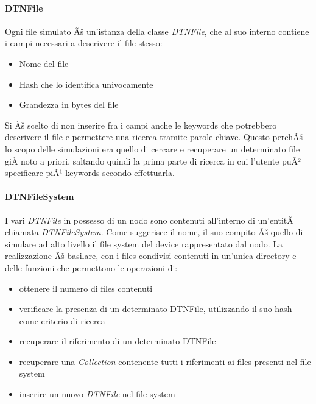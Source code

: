 \paragraph{DTNFile}
Ogni file simulato Ãš un'istanza della classe \textit{DTNFile}, che al suo interno contiene i campi necessari a descrivere il file stesso:

\begin{itemize}
\item Nome del file
\item Hash che lo identifica univocamente
\item Grandezza in bytes del file
\end{itemize}

Si Ãš scelto di non inserire fra i campi anche le keywords che potrebbero descrivere il file e permettere una ricerca tramite parole chiave. Questo perchÃš lo scopo delle simulazioni era quello di cercare e recuperare un determinato file giÃ  noto a priori, saltando quindi la prima parte di ricerca in cui l'utente puÃ² specificare piÃ¹ keywords secondo effettuarla.

\paragraph{DTNFileSystem}
I vari \textit{DTNFile} in possesso di un nodo sono contenuti all'interno di un'entitÃ  chiamata \textit{DTNFileSystem}. Come suggerisce il nome, il suo compito Ãš quello di simulare ad alto livello il file system del device rappresentato dal nodo. La realizzazione Ãš basilare, con i files condivisi contenuti in un'unica directory e delle funzioni che permettono le operazioni di:
\begin{itemize}
\item ottenere il numero di files contenuti
\item verificare la presenza di un determinato DTNFile, utilizzando il suo hash come criterio di ricerca
\item recuperare il riferimento di un determinato DTNFile
\item recuperare una \textit{Collection} contenente tutti i riferimenti ai files presenti nel file system
\item inserire un nuovo \textit{DTNFile} nel file system
\end{itemize}

